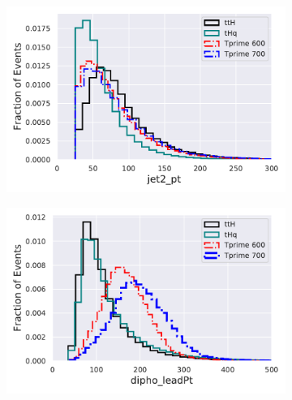 \begin{figure}[H]
\begin{subfigure}{.5\textwidth}
  \centering
  \includegraphics[width=.8\linewidth]{Figure_2/jet2_pt.pdf}  
  \caption{}
  \label{fig:sub-third}
\end{subfigure}
\begin{subfigure}{.5\textwidth}
  \centering
  \includegraphics[width=.8\linewidth]{Figure_2/dipho_leadPt.pdf}  
  \label{fig:sub-fourth}
\end{subfigure}



\end{figure}
